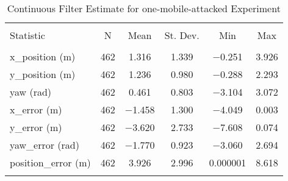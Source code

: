 
\begin{table}[htbp] \centering 
  \caption{Continuous Filter Estimate for one-mobile-attacked Experiment} 
  \label{tab:one_mobile_attacked_continuous_summary} 
\begin{tabular}{@{\extracolsep{5pt}}lccccc} 
\\[-1.8ex]\hline 
\hline \\[-1.8ex] 
Statistic & \multicolumn{1}{c}{N} & \multicolumn{1}{c}{Mean} & \multicolumn{1}{c}{St. Dev.} & \multicolumn{1}{c}{Min} & \multicolumn{1}{c}{Max} \\ 
\hline \\[-1.8ex] 
x\_position (m) & 462 & \num{1.316} & \num{1.339} & \num{-0.251} & \num{3.926} \\ 
y\_position (m) & 462 & \num{1.236} & \num{0.980} & \num{-0.288} & \num{2.293} \\ 
yaw (rad) & 462 & \num{0.461} & \num{0.803} & \num{-3.104} & \num{3.072} \\ 
x\_error (m) & 462 & \num{-1.458} & \num{1.300} & \num{-4.049} & \num{0.003} \\ 
y\_error (m) & 462 & \num{-3.620} & \num{2.733} & \num{-7.608} & \num{0.074} \\ 
yaw\_error (rad) & 462 & \num{-1.770} & \num{0.923} & \num{-3.060} & \num{2.694} \\ 
position\_error (m) & 462 & \num{3.926} & \num{2.996} & \num{0.000001} & \num{8.618} \\ 
\hline \\[-1.8ex] 
\end{tabular} 
\end{table} 
